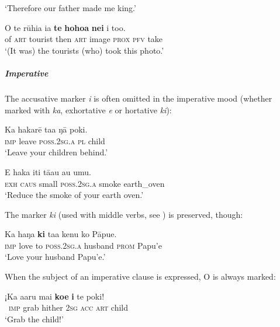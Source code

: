 \glt 
‘Therefore our father made me king.’ \textstyleExampleref{[Ley-2-06.036]}
\z

\ea\label{ex:8.29}
\gll O te rūhia ia \textbf{te} \textbf{hoho{\ꞌ}a} \textbf{nei} i to{\ꞌ}o. \\
of \textsc{art} tourist then \textsc{art} image \textsc{prox} \textsc{pfv} take \\

\glt 
‘(It was) the tourists (who) took this photo.’ \textstyleExampleref{[R415.735]} 
\z

\subparagraph{Imperative} The accusative marker \textit{i} is often omitted in the imperative mood (wheth\-er marked with \textit{ka}, exhortative \textit{e} or hortative \textit{ki}):

\ea\label{ex:8.30}
\gll Ka hakarē ta{\ꞌ}a ŋā poki. \\
\textsc{imp} leave \textsc{poss.2sg.a} \textsc{pl} child \\

\glt 
‘Leave your children behind.’ \textstyleExampleref{[R245.224]} 
\z

\ea\label{ex:8.31}
\gll E haka {\ꞌ}iti tā{\ꞌ}au {\ꞌ}au {\ꞌ}umu.\\
\textsc{exh} \textsc{caus} small \textsc{poss.2sg.a} smoke earth\_oven\\

\glt
‘Reduce the smoke of your earth oven.’ \textstyleExampleref{[Mtx-7-12.026]}
\z

The marker \textit{ki} (used with middle verbs, see ) is preserved, though:

\ea\label{ex:8.32}
\gll Ka haŋa \textbf{ki} ta{\ꞌ}a kenu ko Pāpu{\ꞌ}e.\\
\textsc{imp} love to \textsc{poss.2sg.a} husband \textsc{prom} Papu’e\\

\glt
‘Love your husband Papu’e.’ \textstyleExampleref{[R372.034]} 
\z

When the subject of an imperative clause is expressed, O is always marked:

\ea\label{ex:8.33}
\gll ¡Ka {\ꞌ}a{\ꞌ}aru mai \textbf{koe} \textbf{i} te poki!\\
~\textsc{imp} grab hither \textsc{2sg} \textsc{acc} \textsc{art} child\\

\glt
‘Grab the child!’ \textstyleExampleref{[R210.063]} 
\z

